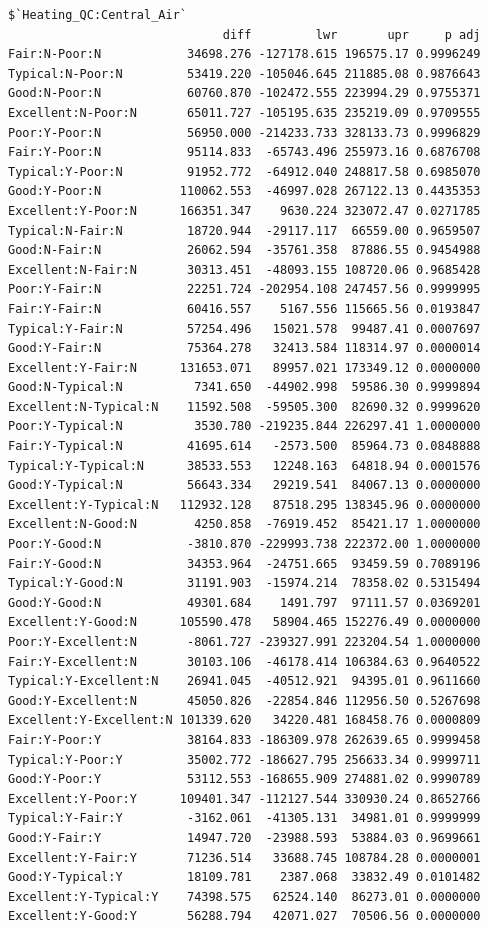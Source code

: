 \documentclass[
  letterpaper,
  DIV=11,
  numbers=noendperiod]{scrreprt}
\begin{document}
\begin{verbatim}
$`Heating_QC:Central_Air`
                              diff         lwr       upr     p adj
Fair:N-Poor:N            34698.276 -127178.615 196575.17 0.9996249
Typical:N-Poor:N         53419.220 -105046.645 211885.08 0.9876643
Good:N-Poor:N            60760.870 -102472.555 223994.29 0.9755371
Excellent:N-Poor:N       65011.727 -105195.635 235219.09 0.9709555
Poor:Y-Poor:N            56950.000 -214233.733 328133.73 0.9996829
Fair:Y-Poor:N            95114.833  -65743.496 255973.16 0.6876708
Typical:Y-Poor:N         91952.772  -64912.040 248817.58 0.6985070
Good:Y-Poor:N           110062.553  -46997.028 267122.13 0.4435353
Excellent:Y-Poor:N      166351.347    9630.224 323072.47 0.0271785
Typical:N-Fair:N         18720.944  -29117.117  66559.00 0.9659507
Good:N-Fair:N            26062.594  -35761.358  87886.55 0.9454988
Excellent:N-Fair:N       30313.451  -48093.155 108720.06 0.9685428
Poor:Y-Fair:N            22251.724 -202954.108 247457.56 0.9999995
Fair:Y-Fair:N            60416.557    5167.556 115665.56 0.0193847
Typical:Y-Fair:N         57254.496   15021.578  99487.41 0.0007697
Good:Y-Fair:N            75364.278   32413.584 118314.97 0.0000014
Excellent:Y-Fair:N      131653.071   89957.021 173349.12 0.0000000
Good:N-Typical:N          7341.650  -44902.998  59586.30 0.9999894
Excellent:N-Typical:N    11592.508  -59505.300  82690.32 0.9999620
Poor:Y-Typical:N          3530.780 -219235.844 226297.41 1.0000000
Fair:Y-Typical:N         41695.614   -2573.500  85964.73 0.0848888
Typical:Y-Typical:N      38533.553   12248.163  64818.94 0.0001576
Good:Y-Typical:N         56643.334   29219.541  84067.13 0.0000000
Excellent:Y-Typical:N   112932.128   87518.295 138345.96 0.0000000
Excellent:N-Good:N        4250.858  -76919.452  85421.17 1.0000000
Poor:Y-Good:N            -3810.870 -229993.738 222372.00 1.0000000
Fair:Y-Good:N            34353.964  -24751.665  93459.59 0.7089196
Typical:Y-Good:N         31191.903  -15974.214  78358.02 0.5315494
Good:Y-Good:N            49301.684    1491.797  97111.57 0.0369201
Excellent:Y-Good:N      105590.478   58904.465 152276.49 0.0000000
Poor:Y-Excellent:N       -8061.727 -239327.991 223204.54 1.0000000
Fair:Y-Excellent:N       30103.106  -46178.414 106384.63 0.9640522
Typical:Y-Excellent:N    26941.045  -40512.921  94395.01 0.9611660
Good:Y-Excellent:N       45050.826  -22854.846 112956.50 0.5267698
Excellent:Y-Excellent:N 101339.620   34220.481 168458.76 0.0000809
Fair:Y-Poor:Y            38164.833 -186309.978 262639.65 0.9999458
Typical:Y-Poor:Y         35002.772 -186627.795 256633.34 0.9999711
Good:Y-Poor:Y            53112.553 -168655.909 274881.02 0.9990789
Excellent:Y-Poor:Y      109401.347 -112127.544 330930.24 0.8652766
Typical:Y-Fair:Y         -3162.061  -41305.131  34981.01 0.9999999
Good:Y-Fair:Y            14947.720  -23988.593  53884.03 0.9699661
Excellent:Y-Fair:Y       71236.514   33688.745 108784.28 0.0000001
Good:Y-Typical:Y         18109.781    2387.068  33832.49 0.0101482
Excellent:Y-Typical:Y    74398.575   62524.140  86273.01 0.0000000
Excellent:Y-Good:Y       56288.794   42071.027  70506.56 0.0000000
\end{verbatim}
\end{document}
